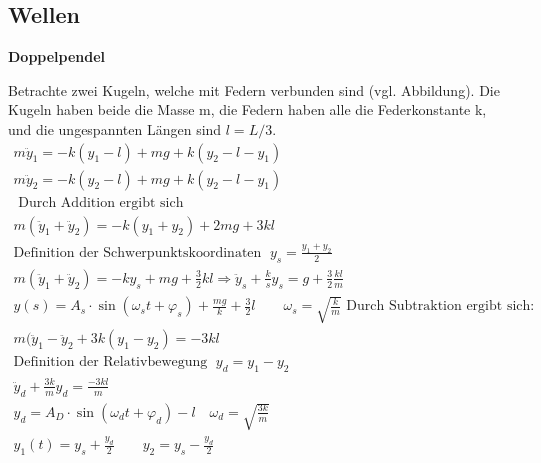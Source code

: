 \newpage
\subsection{Wellen}
\textbf{Doppelpendel}\\
\begin{minipage}{0.69\textwidth}
Betrachte zwei Kugeln, welche mit Federn verbunden sind (vgl. Abbildung). Die Kugeln
haben beide die Masse m, die Federn haben alle die Federkonstante k, und die ungespannten Längen sind $l = L /3$.
\[
	\begin{array}{l}
		m \ddot{y}_1 = -k(y_1-l) +mg + k(y_2-l-y_1)\\
		m \ddot{y}_2 = -k(y_2-l) +mg + k(y_2-l-y_1)\\
		\textrm{ Durch Addition ergibt sich}\\
		m(\ddot{y}_1 + \ddot{y}_2) = -k (y_1+y_2) +2mg +3kl\\
		\textrm{Definition der Schwerpunktskoordinaten } \;y_s = \frac{y_1 + y_2}{2}\\
		m(\ddot{y}_1 + \ddot{y}_2) = -k y_s +mg +\frac{3}{2} kl \Rightarrow \ddot{y}_s + \frac{k}{s} y_s = g +\frac{3}{2} \frac{kl}{m} \\
		y(s) = A_s\cdot \sin (\omega_s t+\varphi_s) +\frac{mg}{k} + \frac{3}{2} l  \qquad \omega_s = \sqrt{\frac{k}{m}}
		\textrm{ Durch Subtraktion ergibt sich:}\\
		m(\ddot{y}_1 -\ddot{y}_2 +3k(y_1 -y_2) = -3kl\\
		\textrm{Definition der Relativbewegung }\; y_d = y_1-y_2\\
		\ddot{y}_d +\frac{3k}{m}y_d =\frac{-3kl}{m}\\
		y_d =  A_D\cdot \sin(\omega_d t+\varphi_d) -l \quad \omega_d = \sqrt{\frac{3k}{m}}\\
		y_1(t) = y_s+\frac{y_d}{2} \qquad y_2 = y_s - \frac{y_d}{2}
	\end{array}
\]
\end{minipage}
\hfill
